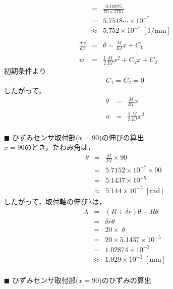 \documentclass[twocolumn,a4j]{jsarticle}
\begin{document}
\begin{itemize}
\begin{eqnarray*}
            &=&\frac{0.10875}{70 × 2701}\\
            &=&5.7518 \cdots × 10^{-7}\\
            &\approx& 5.752 × 10^{-7} \;\left[\mathrm{1/mm}\right]\\ \\
            \frac{dw}{dx} &=& \theta = \frac{M}{EI} x + C_1\\ \\
            w &=& \frac{1}{2} \frac{M}{EI} x^2 + C_1x + C_2
        \end{eqnarray*}
        初期条件より
        \begin{eqnarray*}
            C_1 = C_2 = 0
        \end{eqnarray*}
        したがって，
        \begin{eqnarray*}
            \theta &=& \frac{M}{EI}x\\ \\
            w &=& \frac{1}{2}\frac{M}{EI}x^2\\
        \end{eqnarray*}
            \item [$\blacksquare$] ひずみセンサ取付部($x=90$)の伸びの算出\\
        $x = 90$のとき，たわみ角は，
        \begin{eqnarray*}
            \theta &=& \frac{M}{EI} × 90\\
            &=& 5.7152 × 10^{-7} × 90\\
            &=& 5.1437 × 10^{-5}\\
            &\approx& 5.144 × 10^{-5} \;\left[\mathrm{rad}\right]
        \end{eqnarray*}
        したがって，取付軸の伸び$\lambda$は，
        \begin{eqnarray*}
            \lambda &=& \left(R+\delta r\right)\theta - R\theta\\
            &=& \delta r \theta\\
            &=& 20 × \;\theta\\
            &=& 20 × 5.1437 × 10^{-5}\\
            &=& 1.02874 × 10^{-3}\\
            &\approx& 1.029 × 10^{-3} \;\left[\mathrm{mm}\right]\\
        \end{eqnarray*}
        \item [$\blacksquare$] ひずみセンサ取付部($x=90$)のひずみの算出
            \begin{eqnarray*}

\end{eqnarray*}
\end{itemize}
\end{document}
